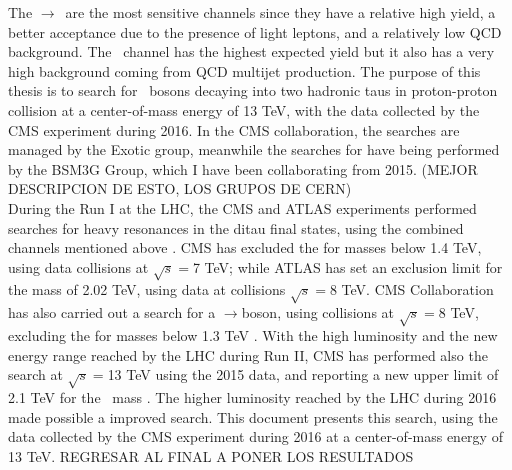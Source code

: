 The \Zprime$\rightarrow$\tauell\tauh~are the most sensitive channels since they have 
a relative high yield, a better acceptance due to the presence of light leptons, and a relatively
low QCD background. The \Zprimetotauh~channel has the highest 
expected yield but it also has a very high background coming 
from QCD multijet production. The purpose of this thesis is to search for \Zprime~bosons decaying into two hadronic taus 
in proton-proton collision at a center-of-mass energy of 13 TeV, with the data collected by the 
CMS  experiment during 2016. In the CMS collaboration, the \Zprime searches 
are managed by the Exotic group, meanwhile the searches for \Zprimetotautau have 
being performed by the BSM3G Group, which I have been collaborating from 2015. (MEJOR DESCRIPCION DE ESTO, LOS GRUPOS DE CERN)\\


During the Run I at the LHC, the CMS and ATLAS experiments performed searches for heavy resonances 
in the ditau final states, using the combined channels mentioned above \cite{CMSZprime2ditaubib,ATLASZprime2ditaubib}.
CMS has excluded the \ZprimeSSM for masses below 1.4 TeV, using data collisions at $\sqrt{s}=$7 TeV; while ATLAS 
has set an exclusion limit for the \ZprimeSSM mass of 2.02 TeV, using data at collisions $\sqrt{s}=$8 TeV. 
CMS Collaboration has also carried out a search for a \Zprime$\rightarrow$\taue\taumu boson, using collisions at $\sqrt{s}=$8 TeV, excluding
the \ZprimeSSM for masses below 1.3 TeV \cite{CMSZprime2ditauelectronmuonbib}. With the high luminosity and the new energy range 
reached by the LHC during Run II, CMS has performed also the \Zprimetotautau search at $\sqrt{s}=$13 TeV using the 2015 data, and reporting 
a new upper limit of 2.1 TeV for the \ZprimeSSM~mass \cite{CMSZprime2tausRunII}. The higher luminosity reached 
by the LHC during 2016 made possible a improved search. This document presents this search, using 
the data collected by the CMS experiment during 2016 at a center-of-mass energy of 13 TeV. REGRESAR AL FINAL A PONER LOS RESULTADOS\\


